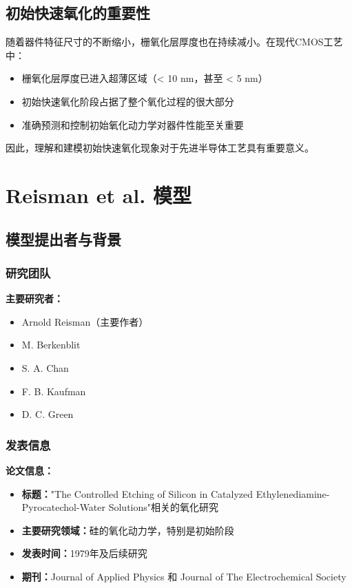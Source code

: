 \documentclass[UTF8,12pt,a4paper]{ctexart}
\begin{document}
\subsection{初始快速氧化的重要性}

随着器件特征尺寸的不断缩小，栅氧化层厚度也在持续减小。在现代CMOS工艺中：
\begin{itemize}
    \item 栅氧化层厚度已进入超薄区域（< 10 nm，甚至 < 5 nm）
    \item 初始快速氧化阶段占据了整个氧化过程的很大部分
    \item 准确预测和控制初始氧化动力学对器件性能至关重要
\end{itemize}

因此，理解和建模初始快速氧化现象对于先进半导体工艺具有重要意义。

\newpage
\section{Reisman et al. 模型}

\subsection{模型提出者与背景}

\subsubsection{研究团队}

\textbf{主要研究者：}
\begin{itemize}
    \item Arnold Reisman（主要作者）
    \item M. Berkenblit
    \item S. A. Chan
    \item F. B. Kaufman
    \item D. C. Green
\end{itemize}

\subsubsection{发表信息}

\textbf{论文信息：}
\begin{itemize}
    \item \textbf{标题：}"The Controlled Etching of Silicon in Catalyzed Ethylenediamine-Pyrocatechol-Water Solutions"相关的氧化研究
    \item \textbf{主要研究领域：}硅的氧化动力学，特别是初始阶段
    \item \textbf{发表时间：}1979年及后续研究
    \item \textbf{期刊：}Journal of Applied Physics 和 Journal of The Electrochemical Society
\end{itemize}
\end{document}
